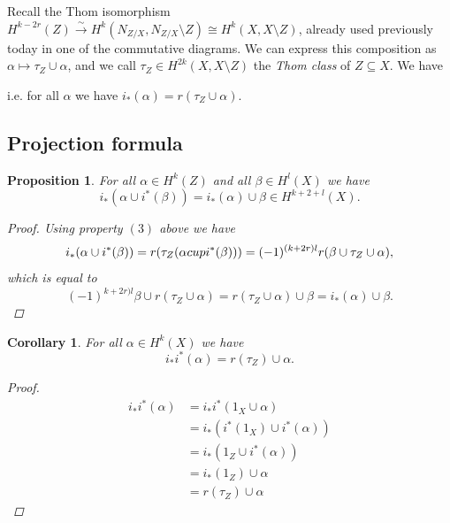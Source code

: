 \documentclass[A4paper, british, reqno]{amsart}
\theoremstyle{darkgreentheorem}
\newtheorem{prop}[thm]{Proposition}
\newtheorem{cor}[thm]{Corollary}
\theoremstyle{darkbluedefinition}
\theoremstyle{darkredexample}
\theoremstyle{remark}
\newcommand{\1}{\mathbbm{1}}
\newcommand{\sub}{\subseteq}
\begin{document}
Recall the Thom isomorphism $H^{k-2r}(Z)\xrightarrow{\sim}H^{k}(N_{Z/X},N_{Z/X}\setminus Z)\cong H^{k}(X,X\setminus Z)$, already used previously today in one of the commutative diagrams.
We can express this composition as $\alpha\mapsto \tau_{Z}\cup \alpha$, and we call $\tau_{Z}\in H^{2k}(X,X\setminus Z)$ the \textit{Thom class} of $Z\sub X$.
We have
\begin{center}
\end{center}
i.e. for all $\alpha$ we have $i_{*}(\alpha)=r(\tau_{Z}\cup \alpha)$.

\subsection{Projection formula}

\begin{prop}
    For all $\alpha\in H^{k}(Z)$ and all $\beta\in H^{l}(X)$ we have
    \[ i_{*}(\alpha\cup i^{*}(\beta))=i_{*}(\alpha)\cup \beta \in H^{k+2+l}(X). \]
    \begin{proof}
	Using property $(3)$ above we have
	\[ i_{*}(\alpha\cup i^{*}(\beta))=r(\tau_{Z}(\alpha\\cup i^{*}(\beta)))=(-1)^{(k+2r)l}r(\beta\cup \tau_{Z}\cup \alpha), \]
	which is equal to
	\[ (-1)^{k+2r)l}\beta \cup r(\tau_{Z}\cup \alpha)=r(\tau_{Z}\cup \alpha)\cup \beta=i_{*}(\alpha)\cup \beta. \]
    \end{proof}
\end{prop}

\begin{cor}
    For all $\alpha\in H^{k}(X)$ we have
    \[ i_{*}i^{*}(\alpha)=r(\tau_{Z})\cup \alpha .\] 
    \begin{proof}
	\begin{align*}
	    i_{*}i^{*}(\alpha) & =i_{*}i^{*}(1_{X}\cup \alpha) \\
	     & = i_{*}(i^{*}(1_{X})\cup i^{*}(\alpha)) \\
	     & = i_{*}(1_{Z}\cup i^{*}(\alpha)) \\
	     & = i_{*}(1_{Z})\cup \alpha \\
	     & = r(\tau_{Z})\cup \alpha
	\end{align*}
    \end{proof}
\end{cor}
\end{document}
